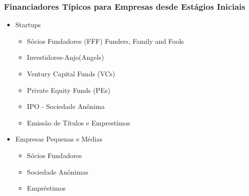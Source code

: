 \documentclass{sciposter}
\begin{document}
\begin{multicols}{3}
\subsubsection*{\textbf{Financiadores Típicos para Empresas desde Estágios Iniciais}}
\begin{itemize}
    \item Startups\begin{itemize}
        \item Sócios Fundadores (FFF) Funders, Family and Fools
        \item Investidores-Anjo(Angels)
        \item Ventury Capital Funds (VCs)
        \item Private Equity Funds (PEs)
        \item IPO - Sociedade Anônima
        \item Emissão de Títulos e Emprestímos
    \end{itemize}
    \item Empresas Pequenas e Médias \begin{itemize}
        \item Sócios Fundadores
        \item Sociedade Anônimas
        \item Empréstimos
    \end{itemize}
\end{itemize}


\end{multicols}
\end{document}
